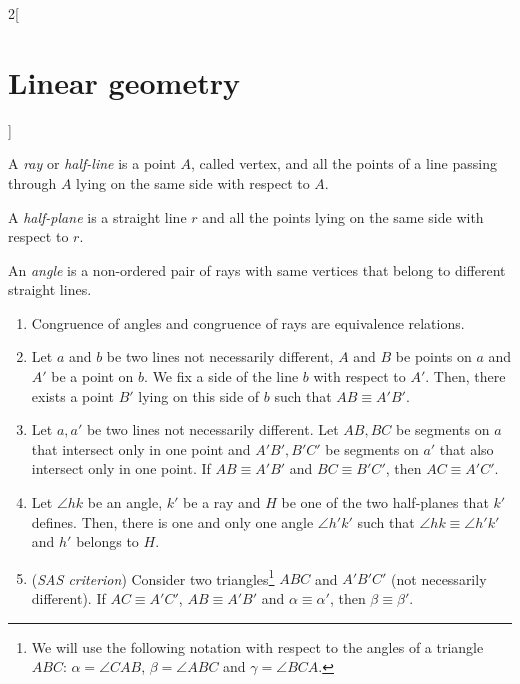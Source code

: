 \documentclass[../../../main.tex]{subfiles}
\begin{document}
\begin{multicols}{2}[\section{Linear geometry}]
\begin{axiom}
\begin{enumerate}
    \end{enumerate}
  \end{axiom}
  \begin{definition}
    A \emph{ray} or \emph{half-line} is a point $A$, called vertex, and all the points of a line passing through $A$ lying on the same side with respect to $A$.
  \end{definition}
  \begin{definition}
    A \emph{half-plane} is a straight line $r$ and all the points lying on the same side with respect to $r$.
  \end{definition}
  \begin{definition}
    An \emph{angle} is a non-ordered pair of rays with same vertices that belong to different straight lines.
  \end{definition}
  \begin{axiom}\label{LG_congruence}
    \hfill
    \begin{enumerate}
      \item Congruence of angles and congruence of rays are equivalence relations.
      \item Let $a$ and $b$ be two lines not necessarily different, $A$ and $B$ be points on $a$ and $A'$ be a point on $b$. We fix a side of the line $b$ with respect to $A'$. Then, there exists a point $B'$ lying on this side of $b$ such that $AB\equiv A'B'$.
      \item Let $a,a'$ be two lines not necessarily different. Let $AB,BC$ be segments on $a$ that intersect only in one point and $A'B',B'C'$ be segments on $a'$ that also intersect only in one point. If $AB\equiv A'B'$ and $BC\equiv B'C'$, then $AC\equiv A'C'$.
      \item Let $\angle hk$ be an angle, $k'$ be a ray and $H$ be one of the two half-planes that $k'$ defines. Then, there is one and only one angle $\angle h'k'$ such that $\angle hk\equiv\angle h'k'$ and $h'$ belongs to $H$.
      \item (\emph{SAS criterion}) Consider two triangles\footnote{We will use the following notation with respect to the angles of a triangle $ABC$: $\alpha=\angle CAB$, $\beta=\angle ABC$ and $\gamma=\angle BCA$.} $ABC$ and $A'B'C'$ (not necessarily different). If $AC\equiv A'C'$, $AB\equiv A'B'$ and $\alpha\equiv\alpha'$, then $\beta\equiv\beta'$.
    \end{enumerate}
  \end{axiom}
  \begin{axiom}

\end{axiom}
\end{multicols}
\end{document}
